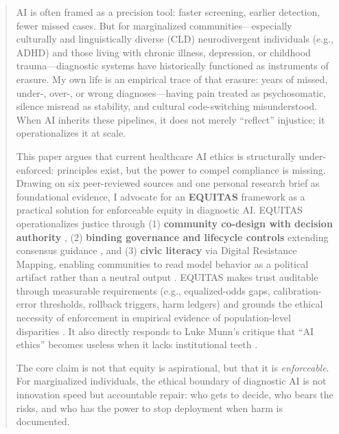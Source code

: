\documentclass[12pt,a4paper]{article}
\begin{document}
\clearpage


\begin{abstract}
\noindent
AI is often framed as a precision tool: faster screening, earlier detection, fewer missed cases. But for marginalized communities—especially culturally and linguistically diverse (CLD) neurodivergent individuals (e.g., ADHD) and those living with chronic illness, depression, or childhood trauma—diagnostic systems have historically functioned as instruments of erasure. My own life is an empirical trace of that erasure: years of missed, under-, over-, or wrong diagnoses—having pain treated as psychosomatic, silence misread as stability, and cultural code-switching misunderstood. When AI inherits these pipelines, it does not merely ``reflect'' injustice; it operationalizes it at scale.

\vspace{0.5cm}
This paper argues that current healthcare AI ethics is structurally under-enforced: principles exist, but the power to compel compliance is missing. Drawing on six peer-reviewed sources and one personal research brief as foundational evidence, I advocate for an \textbf{EQUITAS} framework as a practical solution for enforceable equity in diagnostic AI. EQUITAS operationalizes justice through (1) \textbf{community co-design with decision authority} \citep{Nadarzynski2024}, (2) \textbf{binding governance and lifecycle controls} extending consensus guidance \citep{Lekadir2025}, and (3) \textbf{civic literacy} via Digital Resistance Mapping, enabling communities to read model behavior as a political artifact rather than a neutral output \citep{SocialJusticeStandards2018, Wiegand2020}. EQUITAS makes trust auditable through measurable requirements (e.g., equalized-odds gaps, calibration-error thresholds, rollback triggers, harm ledgers) \citep{Sagona2025, Chen2023} and grounds the ethical necessity of enforcement in empirical evidence of population-level disparities \citep{Marko2025}. It also directly responds to Luke Munn’s critique that ``AI ethics'' becomes useless when it lacks institutional teeth \citep{Munn2023}.

\vspace{0.5cm}
The core claim is not that equity is aspirational, but that it is \emph{enforceable}. For marginalized individuals, the ethical boundary of diagnostic AI is not innovation speed but accountable repair: who gets to decide, who bears the risks, and who has the power to stop deployment when harm is documented.

\vfill
{}
\end{abstract}
\end{document}
